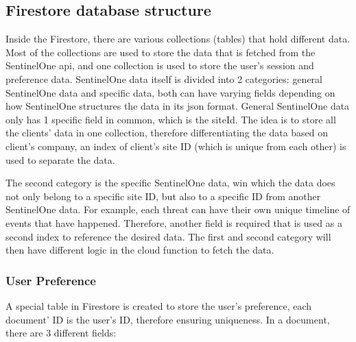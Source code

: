 \begin{multicols}{2}
      \subsection{Firestore database structure}

      Inside the Firestore, there are various collections (tables) that hold different data. Most of the collections are used to store the
      data that is fetched from the SentinelOne \acrshort{api}, and one collection is used to store the user's session and preference data.
      SentinelOne data itself is divided into 2 categories: general SentinelOne data and specific data, both can have varying fields
      depending on how SentinelOne structures the data in its \acrshort{json} format. General SentinelOne data only has 1 specific field
      in common, which is the siteId. The idea is to store all the clients' data in one collection, therefore differentiating the data
      based on client's company, an index of client's site ID (which is unique from each other) is used to separate the data.

      The second category is the specific SentinelOne data, win which the data does not only belong to a specific site ID, but also to a
      specific ID from another SentinelOne data. For example, each threat can have their own unique timeline of events that have happened.
      Therefore, another field is required that is used as a second index to reference the desired data. The first and second category will
      then have different logic in the cloud function to fetch the data.

      \subsubsection{User Preference}

      A special table in Firestore is created to store the user's preference, each document' ID is the user's ID, therefore ensuring
      uniqueness. In a document, there are 3 different fields:


\end{multicols}
